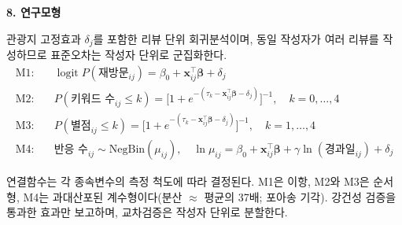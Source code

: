 \documentclass[10pt,a4paper]{article}
\newcommand{\sect}[1]{\vspace{3pt}\noindent\textbf{#1}\par\vspace{1pt}}
\begin{document}
\sect{8. 연구모형}
관광지 고정효과 $\delta_j$를 포함한 리뷰 단위 회귀분석이며, 동일 작성자가 여러 리뷰를 작성하므로
표준오차는 작성자 단위로 군집화한다.
\vspace{-6pt}
\begin{align*}
\text{M1:}\quad & \operatorname{logit} P(\text{재방문}_{ij}) = \beta_0 + \mathbf{x}_{ij}^\top\boldsymbol\beta + \delta_j \\[-1pt]
\text{M2:}\quad & P(\text{키워드 수}_{ij} \le k) = \big[1 + e^{-(\tau_k - \mathbf{x}_{ij}^\top\boldsymbol\beta - \delta_j)}\big]^{-1}, \quad k = 0,\dots,4 \\[-1pt]
\text{M3:}\quad & P(\text{별점}_{ij} \le k) = \big[1 + e^{-(\tau_k - \mathbf{x}_{ij}^\top\boldsymbol\beta - \delta_j)}\big]^{-1}, \quad k = 1,\dots,4 \\[-1pt]
\text{M4:}\quad & \text{반응 수}_{ij} \sim \text{NegBin}(\mu_{ij}), \quad
                  \ln \mu_{ij} = \beta_0 + \mathbf{x}_{ij}^\top\boldsymbol\beta + \gamma \ln(\text{경과일}_{ij}) + \delta_j
\end{align*}
\vspace{-9pt}

연결함수는 각 종속변수의 측정 척도에 따라 결정된다. M1은 이항, M2와 M3은 순서형, M4는 과대산포된
계수형이다(분산 $\approx$ 평균의 37배; 포아송 기각). 강건성 검증을 통과한 효과만 보고하며,
교차검증은 작성자 단위로 분할한다.
\end{document}
